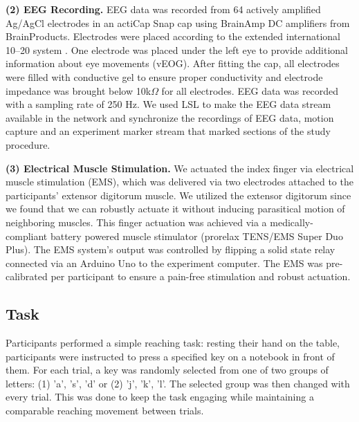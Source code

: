 \indent\textbf{(2) EEG Recording.} EEG data was recorded from 64 actively amplified Ag/AgCl electrodes in an actiCap Snap cap using BrainAmp DC amplifiers from BrainProducts. Electrodes were placed according to the extended international 10–20 system \cite{Chatrian1985-ys}. One electrode was placed under the left eye to provide additional information about eye movements (vEOG). After fitting the cap, all electrodes were filled with conductive gel to ensure proper conductivity and electrode impedance was brought below 10k$\Omega$ for all electrodes. EEG data was recorded with a sampling rate of 250 Hz. We used LSL to make the EEG data stream available in the network and synchronize the recordings of EEG data, motion capture and an experiment marker stream that marked sections of the study procedure.


\indent\textbf{(3) Electrical Muscle Stimulation.} We actuated the index finger via electrical muscle stimulation (EMS), which was delivered via two electrodes attached to the participants' extensor digitorum muscle. We utilized the extensor digitorum since we found that we can robustly actuate it without inducing parasitical motion of neighboring muscles. This finger actuation was achieved via a medically-compliant battery powered muscle stimulator (prorelax TENS/EMS Super Duo Plus). The EMS system's output was controlled by flipping a solid state relay connected via an Arduino Uno to the experiment computer. The EMS was pre-calibrated per participant to ensure a pain-free stimulation and robust actuation.

\subsection{Task}
Participants performed a simple reaching task: resting their hand on the table, participants were instructed to press a specified key on a notebook in front of them. For each trial, a key was randomly selected from one of two groups of letters: (1) 'a', 's', 'd' or (2) 'j', 'k', 'l'. The selected group was then changed with every trial. This was done to keep the task engaging while maintaining a comparable reaching movement between trials.

